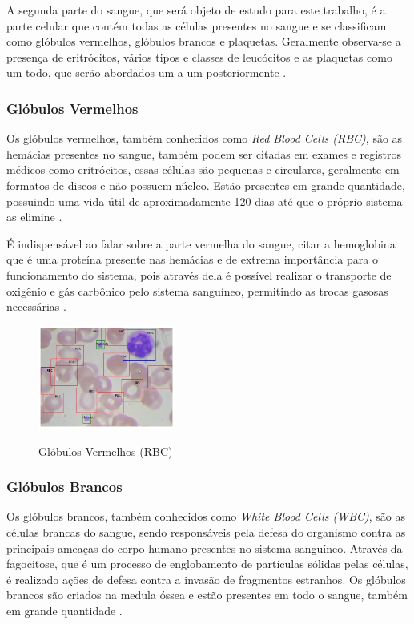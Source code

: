 A segunda parte do sangue, que será objeto de estudo para este trabalho, é a parte celular que contém todas as células presentes no sangue e se classificam como glóbulos vermelhos, glóbulos brancos e plaquetas. Geralmente observa-se a presença de eritrócitos, vários tipos e classes de leucócitos e as plaquetas como um todo, que serão abordados um a um posteriormente \cite{manualHematologia}.

\subsubsection{Glóbulos Vermelhos}
Os glóbulos vermelhos, também conhecidos como \emph{Red Blood Cells (RBC)}, são as hemácias presentes no sangue, também podem ser citadas em exames e registros médicos como eritrócitos, essas células são pequenas e circulares, geralmente em formatos de discos e não possuem núcleo. Estão presentes em grande quantidade, possuindo uma vida útil de aproximadamente 120 dias até que o próprio sistema as elimine \cite{manualHematologia}.

É indispensável ao falar sobre a parte vermelha do sangue, citar a hemoglobina que é uma proteína presente nas hemácias e de extrema importância para o funcionamento do sistema, pois através dela é possível realizar o transporte de oxigênio e gás carbônico pelo sistema sanguíneo, permitindo as trocas gasosas necessárias \cite{manualHematologia}.

\begin{figure}[!htb]
	\centering
	\caption{Glóbulos Vermelhos (RBC)}
	\includegraphics[width=0.40\textwidth]{img/rbc.jpg}
	\label{fig:rbc}
\end{figure}
 
\subsubsection{Glóbulos Brancos}
Os glóbulos brancos, também conhecidos como \emph{White Blood Cells (WBC)}, são as células brancas do sangue, sendo responsáveis pela defesa do organismo contra as principais ameaças do corpo humano presentes no sistema sanguíneo. Através da fagocitose, que é um processo de englobamento de partículas sólidas pelas células, é realizado ações de defesa contra a invasão de fragmentos estranhos. Os glóbulos brancos são criados na medula óssea e estão presentes em todo o sangue, também em grande quantidade \cite{manualHematologia}.

